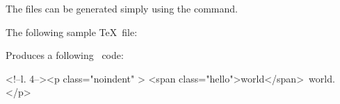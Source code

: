 \begin{texsource}
\end{texsource}

The  files can be generated simply using the  command.

The following sample \TeX\ file:


Produces a following \HTML\ code:

\begin{htmlsource}
<!--l. 4--><p class="noindent" >
<span class="hello">world</span> world. 
</p> 
\end{htmlsource}
